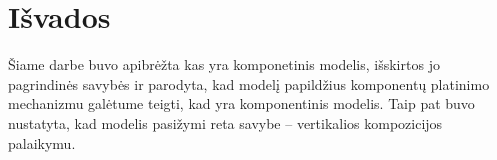 \chapter{Išvados}

Šiame darbe buvo apibrėžta kas yra komponetinis modelis, išskirtos
jo pagrindinės savybės ir parodyta, kad  modelį
papildžius komponentų platinimo mechanizmu galėtume teigti, kad
 yra komponentinis modelis. Taip pat buvo nustatyta,
kad  modelis pasižymi reta savybe – vertikalios
kompozicijos palaikymu.

